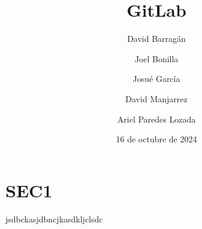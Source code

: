 \documentclass[runningheads]{llncs}
\begin{document}
\title{GitLab}
\author{David Barragán \and
        Joel Bonilla \and
        Josué García \and
        David Manjarrez \and
        Ariel Paredes Lozada \and
        }
\date{16 de octubre de 2024}

\maketitle
\section{SEC1}
jsdbckasjdbncjkasdkljclsdc
\end{document}
